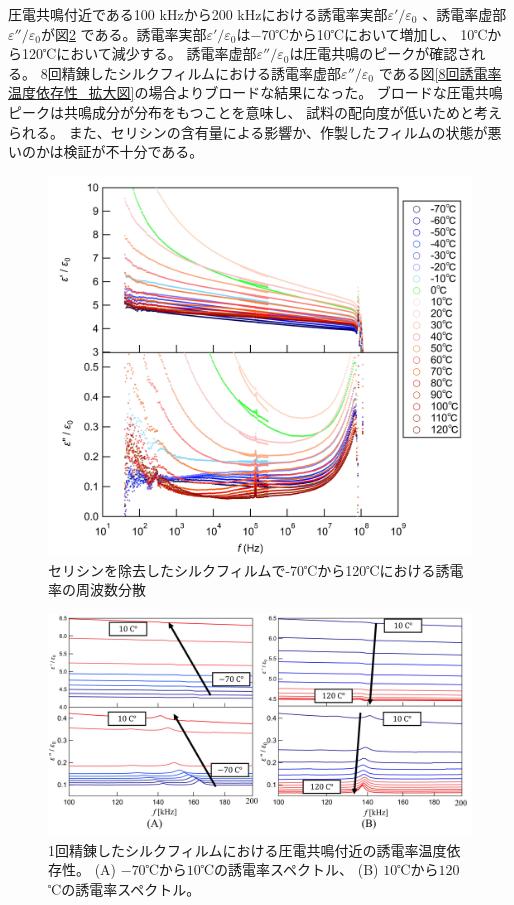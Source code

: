 \documentclass[dvipdfmx,12pt,a4paper]{jreport}
\begin{document}
			圧電共鳴付近である100 kHzから200 kHzにおける誘電率実部$\varepsilon'/\varepsilon_0$
			、誘電率虚部$\varepsilon''/\varepsilon_0$が図\ref{1回誘電率温度依存性_拡大図}
			である。誘電率実部$\varepsilon'/\varepsilon_0$は$-70$℃から10℃において増加し、
			10℃から120℃において減少する。
			誘電率虚部$\varepsilon''/\varepsilon_0$は圧電共鳴のピークが確認される。
			8回精錬したシルクフィルムにおける誘電率虚部$\varepsilon''/\varepsilon_0$
			である図\ref{8回誘電率温度依存性_拡大図}の場合よりブロードな結果になった。
			ブロードな圧電共鳴ピークは共鳴成分が分布をもつことを意味し、
			試料の配向度が低いためと考えられる。
			また、セリシンの含有量による影響か、作製したフィルムの状態が悪いのかは検証が不十分である。
			\begin{figure}[H]
				\centering
				\includegraphics[width=\linewidth]{温度_誘電率_セリシンなし.jpg}
				\caption{セリシンを除去したシルクフィルムで-70℃から120℃における誘電率の周波数分散}
				\label{温度_誘電率_セリシンなし_全体像}
			\end{figure}
			\newpage
			\begin{figure}[h]
				\centering
				\includegraphics[width=\linewidth]{1回_誘電率温度依存性_圧電共鳴付近.jpg}
				\caption{1回精錬したシルクフィルムにおける圧電共鳴付近の誘電率温度依存性。
				(A) $-70$℃から$10$℃の誘電率スペクトル、
				(B) $10$℃から$120$℃の誘電率スペクトル。}
				\label{1回誘電率温度依存性_拡大図}
			\end{figure}
\end{document}
